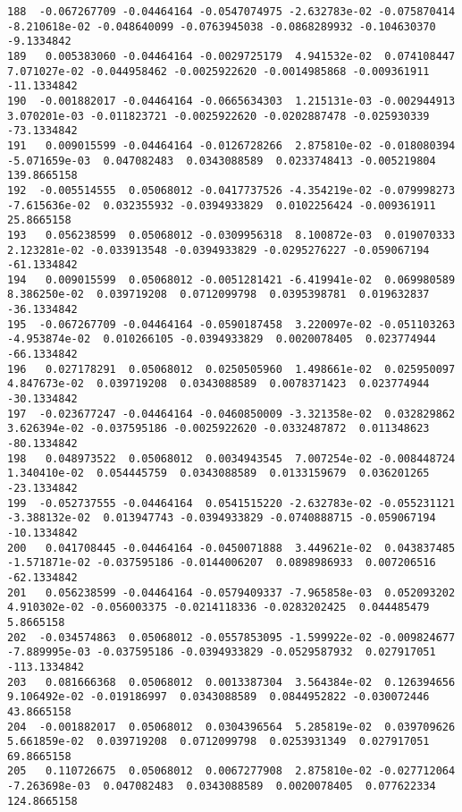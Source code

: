 \documentclass[15pt,a4paper,openright]{article}
\begin{document}
\begin{lstlisting}[language=AMPL, caption = data file]
188  -0.067267709 -0.04464164 -0.0547074975 -2.632783e-02 -0.075870414 -8.210618e-02 -0.048640099 -0.0763945038 -0.0868289932 -0.104630370   -9.1334842
189   0.005383060 -0.04464164 -0.0029725179  4.941532e-02  0.074108447  7.071027e-02 -0.044958462 -0.0025922620 -0.0014985868 -0.009361911  -11.1334842
190  -0.001882017 -0.04464164 -0.0665634303  1.215131e-03 -0.002944913  3.070201e-03 -0.011823721 -0.0025922620 -0.0202887478 -0.025930339  -73.1334842
191   0.009015599 -0.04464164 -0.0126728266  2.875810e-02 -0.018080394 -5.071659e-03  0.047082483  0.0343088589  0.0233748413 -0.005219804  139.8665158
192  -0.005514555  0.05068012 -0.0417737526 -4.354219e-02 -0.079998273 -7.615636e-02  0.032355932 -0.0394933829  0.0102256424 -0.009361911   25.8665158
193   0.056238599  0.05068012 -0.0309956318  8.100872e-03  0.019070333  2.123281e-02 -0.033913548 -0.0394933829 -0.0295276227 -0.059067194  -61.1334842
194   0.009015599  0.05068012 -0.0051281421 -6.419941e-02  0.069980589  8.386250e-02  0.039719208  0.0712099798  0.0395398781  0.019632837  -36.1334842
195  -0.067267709 -0.04464164 -0.0590187458  3.220097e-02 -0.051103263 -4.953874e-02  0.010266105 -0.0394933829  0.0020078405  0.023774944  -66.1334842
196   0.027178291  0.05068012  0.0250505960  1.498661e-02  0.025950097  4.847673e-02  0.039719208  0.0343088589  0.0078371423  0.023774944  -30.1334842
197  -0.023677247 -0.04464164 -0.0460850009 -3.321358e-02  0.032829862  3.626394e-02 -0.037595186 -0.0025922620 -0.0332487872  0.011348623  -80.1334842
198   0.048973522  0.05068012  0.0034943545  7.007254e-02 -0.008448724  1.340410e-02  0.054445759  0.0343088589  0.0133159679  0.036201265  -23.1334842
199  -0.052737555 -0.04464164  0.0541515220 -2.632783e-02 -0.055231121 -3.388132e-02  0.013947743 -0.0394933829 -0.0740888715 -0.059067194  -10.1334842
200   0.041708445 -0.04464164 -0.0450071888  3.449621e-02  0.043837485 -1.571871e-02 -0.037595186 -0.0144006207  0.0898986933  0.007206516  -62.1334842
201   0.056238599 -0.04464164 -0.0579409337 -7.965858e-03  0.052093202  4.910302e-02 -0.056003375 -0.0214118336 -0.0283202425  0.044485479    5.8665158
202  -0.034574863  0.05068012 -0.0557853095 -1.599922e-02 -0.009824677 -7.889995e-03 -0.037595186 -0.0394933829 -0.0529587932  0.027917051 -113.1334842
203   0.081666368  0.05068012  0.0013387304  3.564384e-02  0.126394656  9.106492e-02 -0.019186997  0.0343088589  0.0844952822 -0.030072446   43.8665158
204  -0.001882017  0.05068012  0.0304396564  5.285819e-02  0.039709626  5.661859e-02  0.039719208  0.0712099798  0.0253931349  0.027917051   69.8665158
205   0.110726675  0.05068012  0.0067277908  2.875810e-02 -0.027712064 -7.263698e-03  0.047082483  0.0343088589  0.0020078405  0.077622334  124.8665158

\end{lstlisting}
\end{document}

